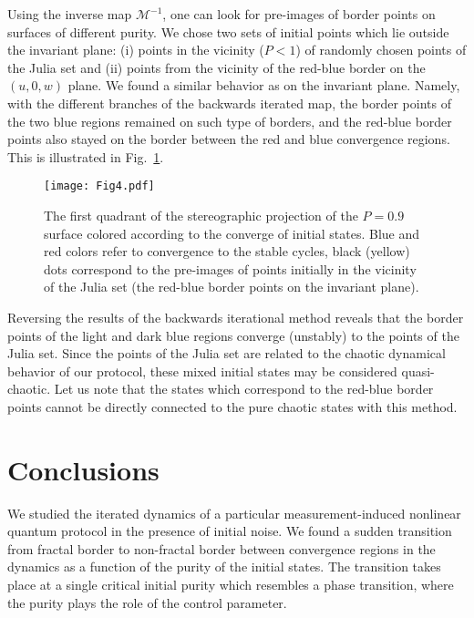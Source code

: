 \documentclass[%
 aip,
 amsmath,amssymb,
 reprint,%
]{revtex4-1}
\begin{document}
Using the inverse map ${\mathcal M}^{-1}$, one can look for pre-images of border points on surfaces of different purity. 
We chose two sets of initial points which lie outside the invariant plane: (i) points in the vicinity ($P<1$) of randomly chosen points of the Julia set and (ii) points from the vicinity of the red-blue border on the $(u,0,w)$ plane. We found a similar behavior as on the invariant plane. Namely, with the different branches of the backwards iterated map, the border points of the two blue regions remained on such type of borders, and the red-blue border points also stayed on the border between the red and blue convergence regions. This is illustrated in Fig.~\ref{Fig4}. 
   
\begin{figure}
\texttt{[image: Fig4.pdf]}
\caption{The first quadrant of the stereographic projection of the $P=0.9$ surface colored according to the converge of initial states. Blue and red colors refer to convergence to the stable cycles, black (yellow) dots correspond to the pre-images of points initially in the vicinity of the Julia set (the red-blue border points on the invariant plane).}
\label{Fig4}
\end{figure} 

Reversing the results of the backwards iterational method reveals that the border points of the light and dark blue regions converge (unstably) to the points of the Julia set. Since the points of the Julia set are related to the chaotic dynamical behavior of our protocol, these mixed initial states may be considered quasi-chaotic. Let us note that the states which correspond to the red-blue border points cannot be directly connected to the pure chaotic states with this method. 

\section{Conclusions}
We studied the iterated dynamics of a particular measurement-induced nonlinear quantum protocol in the presence of initial noise.  We found a sudden transition from fractal border to non-fractal border between convergence regions in the dynamics as a function of the purity of the initial states. The transition takes place at a single critical initial purity which resembles a phase transition, where the purity plays the role of the control parameter. 
\end{document}
